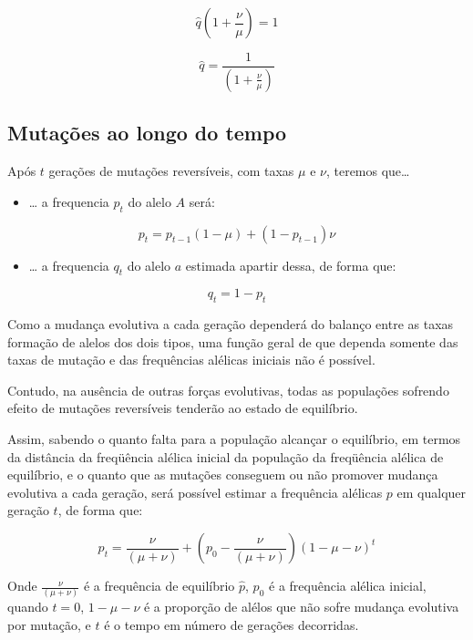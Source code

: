 \documentclass[
]{book}
\providecommand{\tightlist}{%
  \setlength{\itemsep}{0pt}\setlength{\parskip}{0pt}}
\begin{document}
\[\hat{q} \left( 1 + \frac{\nu}{\mu} \right) = 1\]

\[\hat{q} = \frac{1}{\left( 1 + \frac{\nu}{\mu} \right)}\]

\hypertarget{mutauxe7uxf5es-ao-longo-do-tempo}{%
\subsection{Mutações ao longo do tempo}\label{mutauxe7uxf5es-ao-longo-do-tempo}}

Após \(t\) gerações de mutações reversíveis, com taxas \(\mu\) e \(\nu\), teremos que\ldots{}

\begin{itemize}
\tightlist
\item
  \ldots{} a frequencia \(p_t\) do alelo \(A\) será:
\end{itemize}

\[ p_t = p_{t-1} \left( 1 - \mu \right) + \left( 1 - p_{t-1} \right) \nu\]

\begin{itemize}
\tightlist
\item
  \ldots{} a frequencia \(q_t\) do alelo \(a\) estimada apartir dessa, de forma que:
\end{itemize}

\[ q_t = 1 - p_t \]

Como a mudança evolutiva a cada geração dependerá do balanço entre as taxas formação de alelos dos dois tipos, uma função geral de que dependa somente das taxas de mutação e das frequências alélicas iniciais não é possível.

Contudo, na ausência de outras forças evolutivas, todas as populações sofrendo efeito de mutações reversíveis tenderão ao estado de equilíbrio.

Assim, sabendo o quanto falta para a população alcançar o equilíbrio, em termos da distância da freqüência alélica inicial da população da freqüência alélica de equilíbrio, e o quanto que as mutações conseguem ou não promover mudança evolutiva a cada geração, será possível estimar a frequência alélicas \(p\) em qualquer geração \(t\), de forma que:

\[ p_t = \frac{\nu}{(\mu + \nu)} + \left( p_0 - \frac{\nu}{(\mu + \nu)} \right) \left(1- \mu - \nu \right)^t\]

Onde
\(\frac{\nu}{(\mu + \nu)}\) é a frequência de equilíbrio \(\hat{p}\),
\(p_0\) é a frequência alélica inicial, quando \(t=0\),
\(1- \mu - \nu\) é a proporção de alélos que não sofre mudança evolutiva por mutação, e
\(t\) é o tempo em número de gerações decorridas.
\end{document}
